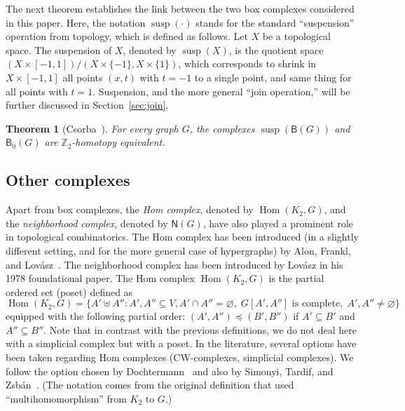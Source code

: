 \documentclass[12pt]{amsart}
\newtheorem{theorem}{Theorem}[section]
\theoremstyle{definition}
\def\Z{\mathbb{Z}}
\def\B{\mathsf{B}}
\def\N{\mathsf{N}}
\renewcommand{\preceq}{\preccurlyeq}
\def\Hom{\operatorname{Hom}}
\def\susp{\operatorname{susp}}
\begin{document}
The next theorem establishes the link between the two box complexes considered in this paper. Here, the notation $\susp(\cdot)$ stands for the standard ``suspension'' operation from topology, which is defined as follows. Let $X$ be a topological space. The suspension of $X$, denoted by $\susp(X)$, is the quotient space $(X \times [-1,1])/(X\times \{-1\}, X \times \{1\})$, which corresponds to shrink in $X\times[-1,1]$ all points $(x,t)$ with $t=-1$ to a single point, and same thing for all points with $t=1$. Suspension, and the more general ``join operation,'' will be further discussed in Section~\ref{sec:join}.

\begin{theorem}[Csorba~\cite{csorba2007homotopy}]\label{thm:susp}
For every graph $G$, the complexes $\susp(\B(G))$ and $\B_0(G)$ are $\Z_2$-homotopy equivalent.
\end{theorem}


\subsection{Other complexes}

Apart from box complexes, the {\em Hom complex}, denoted by $\Hom(K_2,G)$, and the {\em neighborhood complex}, denoted by $\N(G)$, have also played a prominent role in topological combinatorics. The Hom complex has been introduced (in a slightly different setting, and for the more general case of hypergraphs) by Alon, Frankl, and Lov\'asz~\cite{alon1986chromatic}. The neighborhood complex has been introduced by Lov\'asz  in his 1978 foundational paper. The Hom complex $\Hom(K_2,G)$ is the partial ordered set (poset) defined as
\[
\Hom(K_2,G) =  \big\{ A' \uplus A'' \colon A',A'' \subseteq V, A' \cap A'' = \varnothing, \; G[A',A''] \text{ is complete}, \;  A', A'' \neq \varnothing \big\}
\]
equipped with the following partial order: $(A',A'') \preceq (B',B'')$ if $A' \subseteq B'$ and $A'' \subseteq B''$. Note that in contrast with the previous definitions, we do not deal here with a simplicial complex but with a poset. In the literature, several options have been taken regarding Hom complexes (CW-complexes, simplicial complexes). We follow the option chosen by Dochtermann~\cite{Dochtermann09} and also by Simonyi, Tardif, and Zsb\'an~\cite{simonyi2013colourful}. (The notation comes from the original definition that used ``multihomomorphism'' from $K_2$ to $G$.)
\end{document}
